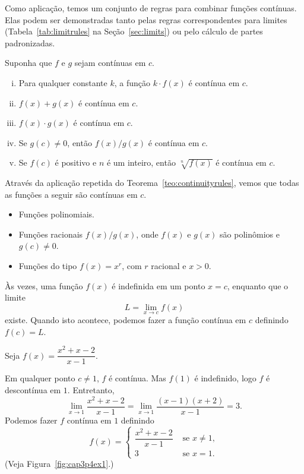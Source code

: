 Como aplicação, temos um conjunto de regras para combinar funções contínuas.
Elas podem ser demonstradas tanto pelas regras correspondentes para limites
(Tabela~\ref{tab:limitrules} na Seção~\ref{sec:limits}) ou pelo cálculo de
partes padronizadas.

\begin{theorem}\label{teo:continuityrules}
Suponha que $f$ e $g$ sejam contínuas em $c$.
\begin{enumerate}[(i)]
\item Para qualquer constante $k$, a função $k \cdot f(x)$ é contínua em $c$.
\item $f(x) + g(x)$ é contínua em $c$.
\item $f(x) \cdot g(x)$ é contínua em $c$.
\item Se $g(c) \ne 0$, então $f(x)/g(x)$ é contínua em $c$.
\item Se $f(c)$ é positivo e $n$ é um inteiro, então $\sqrt[n]{f(x)}$ é
      contínua em $c$.
\end{enumerate}
\end{theorem}

Através da aplicação repetida do Teorema~\ref{teo:continuityrules}, vemos
que todas as funções a seguir são contínuas em $c$.
\begin{itemize}
\item Funções polinomiais.
\item Funções racionais $f(x)/g(x)$, onde $f(x)$ e $g(x)$ são polinômios e
      $g(c) \ne 0$.
\item Funções do tipo $f(x) = x^r$, com $r$ racional e $x > 0$.
\end{itemize}

Às vezes, uma função $f(x)$ é indefinida em um ponto $x = c$, enquanto que
o limite
$$
  L = \lim_{x \to c} f(x)
$$
existe. Quando isto acontece, podemos fazer a função contínua em $c$
definindo $f(c) = L$.

\begin{example}
Seja $f(x) = \dfrac{x^2 + x - 2}{x - 1}$.

Em qualquer ponto $c \ne 1$, $f$ é contínua. Mas $f(1)$ é indefinido, logo
$f$ é descontínua em $1$. Entretanto,
$$
  \lim_{x \to 1} \frac{x^2 + x - 2}{x - 1} =
    \lim_{x \to 1} \frac{(x - 1)(x + 2)}{x - 1} = 3.
$$
Podemos fazer $f$ contínua em $1$ definindo
$$
  f(x) = \left\{ \begin{array}{cl}
           \dfrac{x^2 + x - 2}{x - 1} & \text{ se } x \ne 1, \\[2ex]
           3 & \text{ se } x = 1.
         \end{array} \right.
$$
(Veja Figura~\ref{fig:cap3p4ex1}.)
\end{example}

